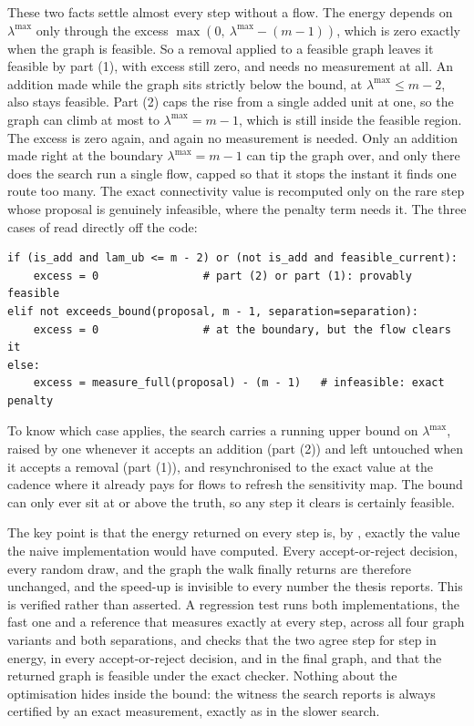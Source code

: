 These two facts settle almost every step without a flow. The energy depends on $\lambda^{\max}$ only through the excess $\max(0,\ \lambda^{\max} - (m-1))$, which is zero exactly when the graph is feasible. So a removal applied to a feasible graph leaves it feasible by part (1), with excess still zero, and needs no measurement at all. An addition made while the graph sits strictly below the bound, at $\lambda^{\max} \le m - 2$, also stays feasible. Part (2) caps the rise from a single added unit at one, so the graph can climb at most to $\lambda^{\max} = m - 1$, which is still inside the feasible region. The excess is zero again, and again no measurement is needed. Only an addition made right at the boundary $\lambda^{\max} = m - 1$ can tip the graph over, and only there does the search run a single flow, capped so that it stops the instant it finds one route too many. The exact connectivity value is recomputed only on the rare step whose proposal is genuinely infeasible, where the penalty term needs it. The three cases of  read directly off the code:

\begin{lstlisting}[caption={The three cases behind \Cref{prop:monotone}, in the order the proof gives them: removal from a feasible graph (part 1), addition below the bound (part 2), and only otherwise a single capped flow.}, label={lst:capped-energy}]
if (is_add and lam_ub <= m - 2) or (not is_add and feasible_current):
    excess = 0                # part (2) or part (1): provably feasible
elif not exceeds_bound(proposal, m - 1, separation=separation):
    excess = 0                # at the boundary, but the flow clears it
else:
    excess = measure_full(proposal) - (m - 1)   # infeasible: exact penalty
\end{lstlisting}

To know which case applies, the search carries a running upper bound on $\lambda^{\max}$, raised by one whenever it accepts an addition (part (2)) and left untouched when it accepts a removal (part (1)), and resynchronised to the exact value at the cadence where it already pays for flows to refresh the sensitivity map. The bound can only ever sit at or above the truth, so any step it clears is certainly feasible.

The key point is that the energy returned on every step is, by , exactly the value the naive implementation would have computed. Every accept-or-reject decision, every random draw, and the graph the walk finally returns are therefore unchanged, and the speed-up is invisible to every number the thesis reports. This is verified rather than asserted. A regression test runs both implementations, the fast one and a reference that measures exactly at every step, across all four graph variants and both separations, and checks that the two agree step for step in energy, in every accept-or-reject decision, and in the final graph, and that the returned graph is feasible under the exact checker. Nothing about the optimisation hides inside the bound: the witness the search reports is always certified by an exact measurement, exactly as in the slower search.

